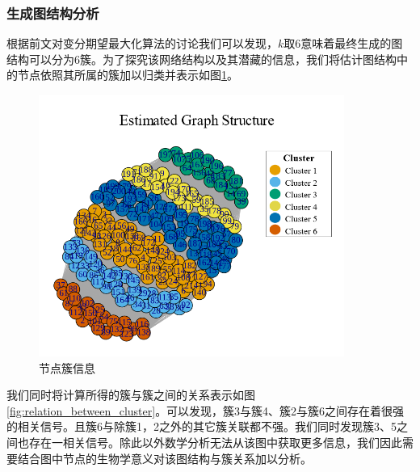 \subsubsection{生成图结构分析}

根据前文对变分期望最大化算法的讨论我们可以发现，$k$取6意味着最终生成的图结构可以分为6簇。为了探究该网络结构以及其潜藏的信息，我们将估计图结构中的节点依照其所属的簇加以归类并表示如图\ref{fig:Cluster}。

\begin{figure}[!ht]
\centering
\includegraphics[width=10cm]{figures/Chapter4/VEM/Model/Cluster.png}
\caption{节点簇信息} \label{fig:Cluster}
\end{figure}

我们同时将计算所得的簇与簇之间的关系表示如图\ref{fig:relation_between_cluster}。可以发现，簇3与簇4、簇2与簇6之间存在着很强的相关信号。且簇6与除簇1，2之外的其它簇关联都不强。我们同时发现簇3、5之间也存在一相关信号。除此以外数学分析无法从该图中获取更多信息，我们因此需要结合图中节点的生物学意义对该图结构与簇关系加以分析。

